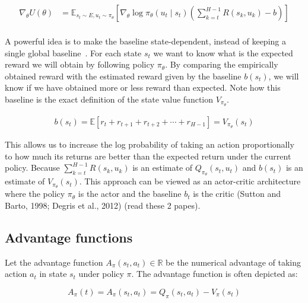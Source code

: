 \documentclass{../main.tex}{subfiles}
\begin{document}
\begin{equation}\label{equation:utility-gradient-baseline-temporal}
\begin{aligned}
\nabla_{\theta} U(\theta) & = \mathbb{E}_{s_t \sim E, u_t \sim \pi_{\theta}} [\nabla_{\theta} \log \pi_{\theta}(u_t \mid s_t) (\sum_{k=t}^{H-1}R(s_k, u_k) - b)] \\
\end{aligned}
\end{equation}

A powerful idea is to make the baseline state-dependent, instead of keeping a single global baseline~\citep{Baxter2001}. For each state $s_t$ we want to know what is the expected reward we will obtain by following policy $\pi_{\theta}$. By comparing the empirically obtained reward with the estimated reward given by the baseline $b(s_t)$, we will know if we have obtained more or less reward than expected. Note how this baseline is the exact definition of the state value function $V_{\pi_{\theta}}$.

\begin{equation}\label{equation:baseline-state-dependent}
\begin{aligned}
b(s_t) = \mathbb{E}[r_t + r_{t+1} + r_{t+2} + \cdots + r_{H-1}] = V_{\pi_{\theta}}(s_t)
\end{aligned}
\end{equation}

This allows us to increase the log probability of taking an action proportionally to how much its returns are better than the expected return under the current policy. Because $\sum_{k=t}^{H-1}R(s_k, u_k)$ is an estimate of $Q_{\pi_{\theta}}(s_t, u_t)$ and $b(s_t)$ is an estimate of $V_{\pi_{\theta}}(s_t)$. This approach can be viewed as an actor-critic architecture where the policy $\pi_{\theta}$ is the actor and the baseline $b_t$ is the critic (Sutton and Barto, 1998; Degris et al., 2012) (read these 2 papes).

\subsection{Advantage functions}

Let the advantage function $A_{\pi}(s_t, a_t) \in \mathbb{R}$ be the numerical advantage of taking action $a_t$ in state $s_t$ under policy $\pi$. The advantage function is often depicted as:

\begin{equation}
A_{\pi}(t) = A_{\pi}(s_t, a_t) = Q_{\pi}(s_t, a_t) - V_{\pi}(s_t)
\end{equation}
\end{document}
